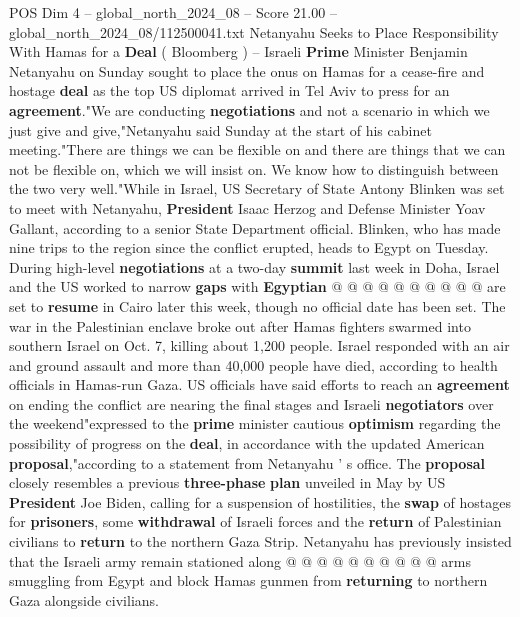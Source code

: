 \begin{textsample}{POS Dim 4 – global\_north\_2024\_08 – Score 21.00 – global\_north\_2024\_08/112500041.txt}  \label{ex:f4_pos_159}
Netanyahu Seeks to Place Responsibility With Hamas for a \textbf{Deal} ( Bloomberg ) -- Israeli \textbf{Prime} Minister Benjamin Netanyahu on Sunday sought to place the onus on Hamas for a cease-fire and hostage \textbf{deal} as the top US diplomat arrived in Tel Aviv to press for an \textbf{agreement}."We are conducting \textbf{negotiations} and not a scenario in which we just give and give,"Netanyahu said Sunday at the start of his cabinet meeting."There are things we can be flexible on and there are things that we can not be flexible on, which we will insist on.
We know how to distinguish between the two very well."While in Israel, US Secretary of State Antony Blinken was set to meet with Netanyahu, \textbf{President} Isaac Herzog and Defense Minister Yoav Gallant, according to a senior State Department official.
Blinken, who has made nine trips to the region since the conflict erupted, heads to Egypt on Tuesday.
During high-level \textbf{negotiations} at a two-day \textbf{summit} last week in Doha, Israel and the US worked to narrow \textbf{gaps} with \textbf{Egyptian} @ @ @ @ @ @ @ @ @ @ are set to \textbf{resume} in Cairo later this week, though no official date has been set.
The war in the Palestinian enclave broke out after Hamas fighters swarmed into southern Israel on Oct. 7, killing about 1,200 people.
Israel responded with an air and ground assault and more than 40,000 people have died, according to health officials in Hamas-run Gaza.
US officials have said efforts to reach an \textbf{agreement} on ending the conflict are nearing the final stages and Israeli \textbf{negotiators} over the weekend"expressed to the \textbf{prime} minister cautious \textbf{optimism} regarding the possibility of progress on the \textbf{deal}, in accordance with the updated American \textbf{proposal},"according to a statement from Netanyahu ' s office.
The \textbf{proposal} closely resembles a previous \textbf{three-phase} \textbf{plan} unveiled in May by US \textbf{President} Joe Biden, calling for a suspension of hostilities, the \textbf{swap} of hostages for \textbf{prisoners}, some \textbf{withdrawal} of Israeli forces and the \textbf{return} of Palestinian civilians to \textbf{return} to the northern Gaza Strip.
Netanyahu has previously insisted that the Israeli army remain stationed along @ @ @ @ @ @ @ @ @ @ arms smuggling from Egypt and block Hamas gunmen from \textbf{returning} to northern Gaza alongside civilians.

\end{textsample}
